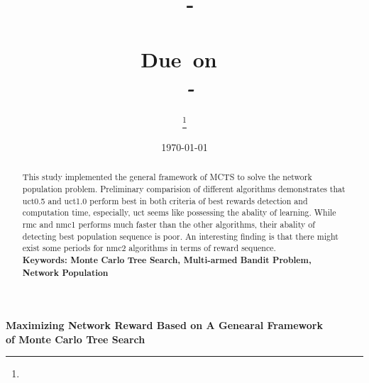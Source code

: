 \documentclass{article}
\title{
\vspace{2in}
\textmd{\textbf{\hmwkClassID \ - \hmwkClassName }}\\
\textmd{\textbf{\hmwkTitle}}\\
\normalsize\vspace{0.1in}\small{Due\ on\ \hmwkDueDate}\\
\vspace{0.1in}\large{\textit{\hmwkClassInstructor\ - \hmwkClassTime}}
\vspace{3in}
}
\author{\textbf{\hmwkAuthorName} \thanks{\hmwkAuthorEmail}}
\affil{Department of Industrial \& Systems Engineering \\ National University of Singapore}
\date{\today} %
\begin{document}
\maketitle




\newpage

\begin{center}
\textbf{\large{Maximizing Network Reward Based on A Genearal Framework \\ of Monte Carlo Tree Search }}
\end{center}

\begin{abstract}
This study implemented the general framework of MCTS to solve the network population problem. Preliminary comparision of different algorithms demonstrates that uct0.5 and uct1.0 perform best in both criteria of best rewards detection and computation time, especially, uct seems like possessing the abality of learning. While rmc and nmc1 performs much faster than the other algorithms, their abality of detecting best population sequence is poor. An interesting finding is that there might exist some periods for nmc2 algorithms in terms of reward sequence.\\

\textbf{Keywords: Monte Carlo Tree Search, Multi-armed Bandit Problem, Network Population}
\end{abstract}
\end{document}
